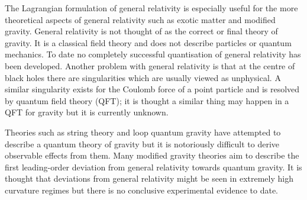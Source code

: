 The Lagrangian formulation of general relativity is especially useful for the more theoretical aspects of general relativity such as exotic matter and modified gravity. General relativity is not thought of as the correct or final theory of gravity. It is a classical field theory and does not describe particles or quantum mechanics. To date no completely successful quantisation of general relativity has been developed. Another problem with general relativity is that at the centre of black holes there are singularities which are usually viewed as unphysical. A similar singularity exists for the Coulomb force of a point particle and is resolved by quantum field theory (QFT); it is thought a similar thing may happen in a QFT for gravity but it is currently unknown.

Theories such as string theory and loop quantum gravity have attempted to describe a quantum theory of gravity but it is notoriously difficult to derive observable effects from them. Many modified gravity theories aim to describe the first leading-order deviation from general relativity towards quantum gravity. It is thought that deviations from general relativity might be seen in extremely high curvature regimes but there is no conclusive experimental evidence to date.





